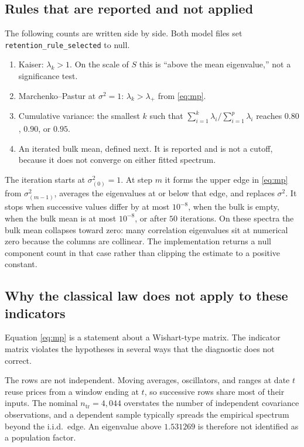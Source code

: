\documentclass[11pt]{article}
\begin{document}
\subsection{Rules that are reported and not applied}

The following counts are written side by side.
Both model files set \texttt{retention\_rule\_selected} to null.

\begin{enumerate}
\item Kaiser: \(\lambda_k>1\).
On the scale of \(S\) this is ``above the mean eigenvalue,'' not a significance test.
\item Marchenko--Pastur at \(\sigma^2=1\): \(\lambda_k>\lambda_+\) from \eqref{eq:mp}.
\item Cumulative variance: the smallest \(k\) such that \(\sum_{i=1}^{k}\lambda_i\big/\sum_{i=1}^{p}\lambda_i\) reaches \(0.80\), \(0.90\), or \(0.95\).
\item An iterated bulk mean, defined next.
It is reported and is not a cutoff, because it does not converge on either fitted spectrum.
\end{enumerate}

The iteration starts at \(\sigma^2_{(0)}=1\).
At step \(m\) it forms the upper edge in \eqref{eq:mp} from \(\sigma^2_{(m-1)}\), averages the eigenvalues at or below that edge, and replaces \(\sigma^2\).
It stops when successive values differ by at most \(10^{-8}\), when the bulk is empty, when the bulk mean is at most \(10^{-8}\), or after \(50\) iterations.
On these spectra the bulk mean collapses toward zero: many correlation eigenvalues sit at numerical zero because the columns are collinear.
The implementation returns a null component count in that case rather than clipping the estimate to a positive constant.

\subsection{Why the classical law does not apply to these indicators}
\label{sec:mp-limits}

Equation \eqref{eq:mp} is a statement about a Wishart-type matrix.
The indicator matrix violates the hypotheses in several ways that the diagnostic does not correct.

The rows are not independent.
Moving averages, oscillators, and ranges at date \(t\) reuse prices from a window ending at \(t\), so successive rows share most of their inputs.
The nominal \(n_{\mathrm{tr}}=4{,}044\) overstates the number of independent covariance observations, and a dependent sample typically spreads the empirical spectrum beyond the i.i.d.\ edge.
An eigenvalue above \(1.531269\) is therefore not identified as a population factor.
\end{document}
